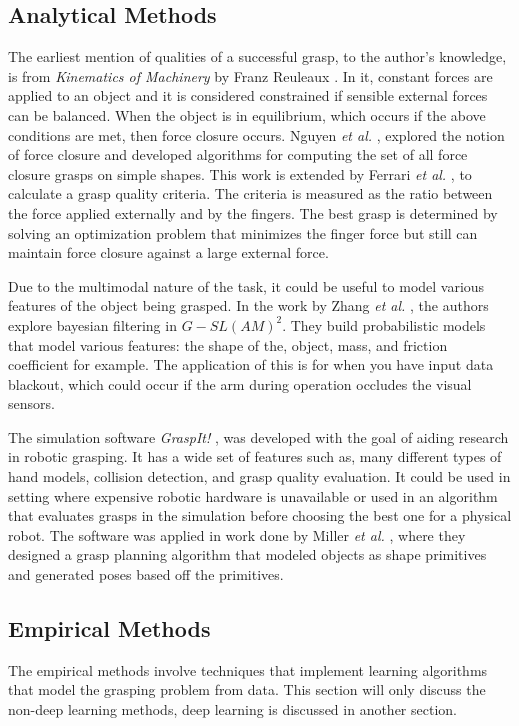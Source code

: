 \documentclass{article}
\begin{document}
\subsection{Analytical Methods}
The earliest mention of qualities of a successful grasp, to the author's
knowledge, is from \textit{Kinematics of Machinery} by Franz Reuleaux
\cite{reuleaux76}.
In it, constant forces are applied to an object and it is considered
constrained if sensible external forces can be balanced. When the
object is in equilibrium, which occurs if the above conditions are
met, then force closure occurs. Nguyen \textit{et al.} \cite{nguyen86},
explored the notion of force closure and developed algorithms for computing
the set of all force closure grasps on simple shapes.
This work is extended by Ferrari \textit{et al.} \cite{ferrari92}, to calculate
a grasp quality criteria. The criteria is measured as the ratio between the force
applied externally and by the fingers. The best grasp is determined by solving
an optimization problem that minimizes the finger force but still can maintain
force closure against a large external force.

Due to the multimodal nature of the task, it could be useful to model various
features of the object being grasped. In the work by Zhang \textit{et al.}
\cite{zhang12}, the authors explore bayesian filtering in $G-SL(AM)^2$. They
build probabilistic models that model various features: the shape of the,
object, mass, and friction coefficient for example. The application of this
is for when you have input data blackout, which could occur if the arm
during operation occludes the visual sensors.

The simulation software \textit{GraspIt!} \cite{miller04}, was developed with
the goal of aiding research in robotic grasping. It has a wide set of features
such as, many different types of hand models, collision detection, and grasp
quality evaluation. It could be used in setting where expensive robotic hardware
is unavailable or used in an algorithm that evaluates grasps in the simulation
before choosing the best one for a physical robot.
The software was applied in work done by Miller
\textit{et al.} \cite{miller03}, where they designed a grasp planning algorithm
that modeled objects as shape primitives and generated poses based off the
primitives.

\subsection{Empirical Methods}
The empirical methods involve techniques that implement learning algorithms that
model the grasping problem from data. This section will only discuss the
non-deep learning methods, deep learning is discussed in another section.
\end{document}
